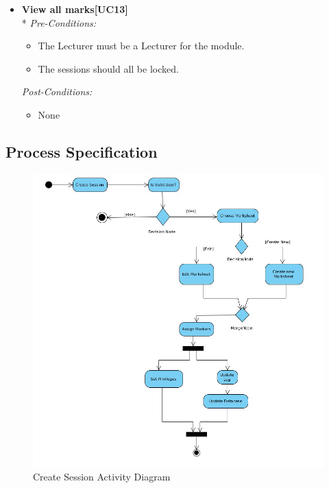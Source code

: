 \documentclass[a4paper]{article}
\begin{document}
\begin{itemize}
				\item	\textbf{View all marks[UC13]}\\*
						\textit{Pre-Conditions:}
								\begin{itemize}
									\item The Lecturer must be a Lecturer for the module.
									\item The sessions should all be locked.
								\end{itemize}
								
						\textit{Post-Conditions:}
								\begin{itemize}
									\item None
								\end{itemize}
			\end{itemize}

		\subsection{Process Specification}
		
		
			\begin{figure}[H]
				\centering
				\includegraphics[width=1\textwidth]{CreateSessionActivityDiagram}
				\caption{Create Session Activity Diagram}
			\end{figure}
			
\end{document}
